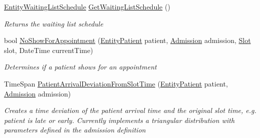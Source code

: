 \begin{DoxyCompactItemize}
\hyperlink{class_general_health_care_elements_1_1_booking_models_1_1_entity_waiting_list_schedule}{Entity\+Waiting\+List\+Schedule} \hyperlink{class_general_health_care_elements_1_1_input_1_1_generic_x_m_l_h_c_dep_input_with_admission_and_booking_model_abdc7c5fb9d801077d4e44463199e24a8}{Get\+Waiting\+List\+Schedule} ()
\begin{DoxyCompactList}\small\item\em Returns the waiting list schedule \end{DoxyCompactList}\item 
bool \hyperlink{class_general_health_care_elements_1_1_input_1_1_generic_x_m_l_h_c_dep_input_with_admission_and_booking_model_af83fb0565f746c3e91e4c0ff0a4b903e}{No\+Show\+For\+Appointment} (\hyperlink{class_general_health_care_elements_1_1_entities_1_1_entity_patient}{Entity\+Patient} patient, \hyperlink{class_general_health_care_elements_1_1_treatment_admission_types_1_1_admission}{Admission} admission, \hyperlink{class_general_health_care_elements_1_1_booking_models_1_1_slot}{Slot} slot, Date\+Time current\+Time)
\begin{DoxyCompactList}\small\item\em Determines if a patient shows for an appointment \end{DoxyCompactList}\item 
Time\+Span \hyperlink{class_general_health_care_elements_1_1_input_1_1_generic_x_m_l_h_c_dep_input_with_admission_and_booking_model_ab2b61eaf04a169fe3c856a37581bcb4e}{Patient\+Arrival\+Deviation\+From\+Slot\+Time} (\hyperlink{class_general_health_care_elements_1_1_entities_1_1_entity_patient}{Entity\+Patient} patient, \hyperlink{class_general_health_care_elements_1_1_treatment_admission_types_1_1_admission}{Admission} admission)
\begin{DoxyCompactList}\small\item\em Creates a time deviation of the patient arrival time and the original slot time, e.\+g. patient is late or early. Currently implements a triangular distribution with parameters defined in the admission definition \end{DoxyCompactList}\end{DoxyCompactItemize}

